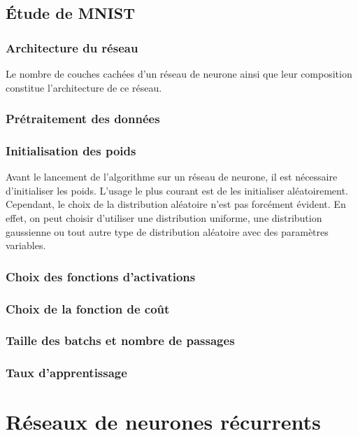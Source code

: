 \documentclass{report}
\begin{document}
\section{\'Etude de MNIST}
\subsection{Architecture du réseau}
Le nombre de couches cachées d'un réseau de neurone ainsi que leur composition constitue l'architecture de ce réseau.


\subsection{Prétraitement des données}


\subsection{Initialisation des poids}
Avant le lancement de l'algorithme sur un réseau de neurone, il est nécessaire d'initialiser les poids.	L'usage le plus courant est de les initialiser aléatoirement. Cependant, le choix de la distribution aléatoire n'est pas forcément évident. En effet, on peut choisir d'utiliser une distribution uniforme, une distribution gaussienne ou tout autre type de distribution aléatoire avec des paramètres variables.


\subsection{Choix des fonctions d'activations}


\subsection{Choix de la fonction de coût}


\subsection{Taille des batchs et nombre de passages}


\subsection{Taux d'apprentissage}


\chapter{Réseaux de neurones récurrents}
\end{document}
